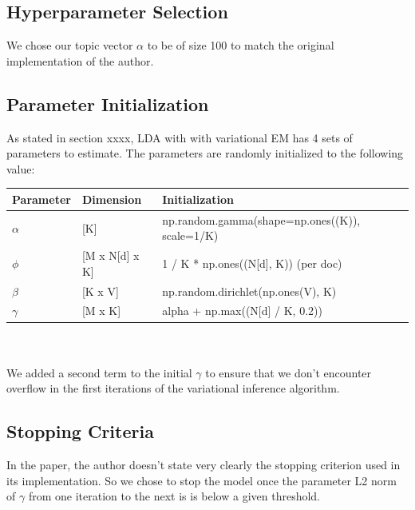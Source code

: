 \documentclass[11pt]{article}
\begin{document}
\subsection{Hyperparameter Selection}
We chose our topic vector $\alpha$ to be of size 100 to match the original implementation of the author. 

\subsection{Parameter   Initialization}
As stated in section xxxx, LDA with with variational EM has 4 sets of parameters to estimate. The parameters are randomly initialized to the following value:

\begin{tabular}{ |p{2cm}||p{3cm}|p{10cm}| }
 \hline
 Parameter & Dimension  & Initialization\\
 \hline
  $\alpha$ & [K]   & np.random.gamma(shape=np.ones((K)), scale=1/K)\\
  $\phi$  & [M x N[d] x K]  & 1 / K * np.ones((N[d], K)) (per doc)\\
  $\beta$  & [K x V]  &  np.random.dirichlet(np.ones(V), K)\\
  $\gamma $  & [M x K]  &  alpha + np.max((N[d] / K, 0.2)) \\
  \hline
\end{tabular}\\
\\
We added a second term to the initial $\gamma $ to ensure that we don't encounter overflow in the first iterations of the variational inference algorithm.
\\
\subsection{Stopping Criteria }
In the paper, the author doesn't state very clearly the stopping criterion used in its implementation. So we chose to stop the model once the parameter L2 norm of $\gamma$   from one iteration to the next is is below a given threshold. 
\\
\end{document}
